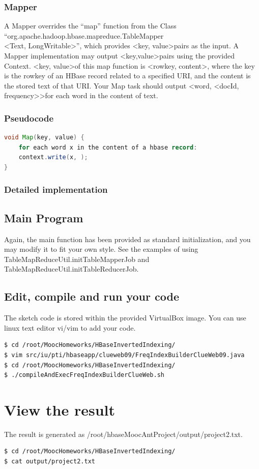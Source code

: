 \subsubsection{Mapper}
A Mapper overrides the ``map'' function from the Class ``org.apache.hadoop.hbase.mapreduce.TableMapper\\
\textless Text, LongWritable\textgreater'', which provides \textless key, value\textgreater pairs as the input. A Mapper implementation may output \textless key,value\textgreater pairs using the provided Context.
\textless key, value\textgreater of this map function is \textless rowkey, content\textgreater, where the key is the rowkey of an HBase record related to a specified URI, and the content is the stored text of that URI. Your Map task should output \textless word, \textless docId, frequency\textgreater\textgreater for each word in the content of text.

\subsubsection{Pseudocode}
\begin{lstlisting}[language=Java]
void Map(key, value) {
    for each word x in the content of a hbase record:
    context.write(x, );
}
\end{lstlisting}

\subsubsection{Detailed implementation}


\subsection{Main Program}
Again, the main function has been provided as standard initialization, and you
may modify it to fit your own style. See the examples of using
TableMapReduceUtil.initTableMapperJob and
TableMapReduceUtil.initTableReducerJob.

\subsection{Edit, compile and run your code}
The sketch code is stored within the provided VirtualBox image. You can use
linux text editor vi/vim to add your code.

\begin{lstlisting}[language=bash]
$ cd /root/MoocHomeworks/HBaseInvertedIndexing/
$ vim src/iu/pti/hbaseapp/clueweb09/FreqIndexBuilderClueWeb09.java
$ cd /root/MoocHomeworks/HBaseInvertedIndexing/
$ ./compileAndExecFreqIndexBuilderClueWeb.sh
\end{lstlisting}

\section{View the result}
The result is generated as /root/hbaseMoocAntProject/output/project2.txt. 
\begin{lstlisting}[language=bash]
$ cd /root/MoocHomeworks/HBaseInvertedIndexing/
$ cat output/project2.txt
\end{lstlisting}

